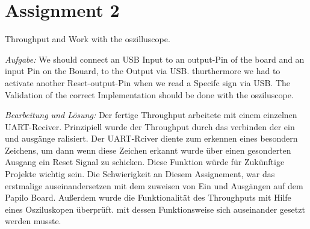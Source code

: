 \section*{Assignment 2}
Throughput and Work with the oszilluscope.

\emph{Aufgabe: } We should connect an USB Input to an output-Pin of the board and an input Pin on the Bouard, to the Output via USB. thurthermore we had to activate another Reset-output-Pin when we read a Specifc sign via USB. The Validation of the correct Implementation should be done with the osziluscope.


\emph{Bearbeitung und Lösung: } Der fertige Throughput arbeitete mit einem einzelnen UART-Reciver. Prinzipiell wurde der Throughput durch das verbinden der ein und ausgänge ralisiert. Der UART-Rciver diente zum erkennen eines besondern Zeichens, um dann wenn diese Zeichen erkannt wurde über einen gesonderten Ausgang ein Reset Signal zu schicken. Diese Funktion würde für Zukünftige Projekte wichtig sein.
Die Schwierigkeit an Diesem Assignement, war das erstmalige auseinandersetzen mit dem zuweisen von Ein und Ausgängen auf dem Papilo Board. Außerdem wurde die Funktionalität des Throughputs mit Hilfe eines Osziluskopen überprüft. mit dessen Funktionsweise sich auseinander gesetzt werden musste.
